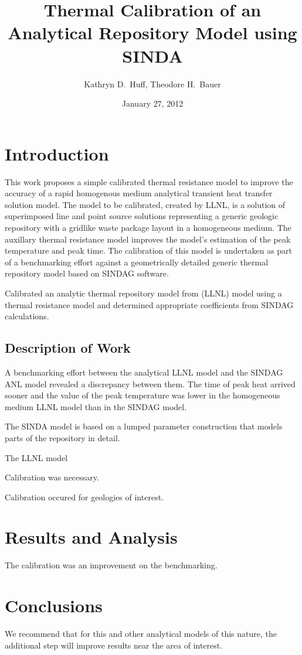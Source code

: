 \documentclass{anstrans}
\title{Thermal Calibration of an Analytical Repository Model using SINDA}
\author{Kathryn D.~Huff, Theodore H.~Bauer}
\institute{Department of Nuclear Engineering \& Engineering Physics, University 
of Wisconsin, Madison, WI, 53706\\
Nuclear Engineering Division, Argonne National Laboratory, Argonne, IL, 60439}
\date{January 27, 2012}
\begin{document}
\section{Introduction}

This work proposes a simple calibrated thermal resistance model to improve the 
accuracy of a rapid homogenous medium analytical transient heat transfer 
solution model. The model to be calibrated, created by \gls{LLNL}, is a solution 
of superimposed line and point source solutions representing a generic geologic 
repository with a gridlike waste package layout in a homogeneous medium. The 
auxillary thermal resistance model improves the model's estimation of the peak 
temperature and peak time. The calibration of this model is undertaken as part 
of a benchmarking effort against a geometrically detailed generic thermal 
repository model based on \gls{SINDAG} software.

Calibrated an analytic thermal repository model from (\gls{LLNL}) model using a 
thermal resistance model and determined appropriate coefficients from 
\gls{SINDAG} calculations. 


\subsection{Description of Work}

A benchmarking effort between the analytical \gls{LLNL} model and the 
\gls{SINDAG} \gls{ANL} model revealed a discrepancy between them. The time of 
peak heat arrived sooner and the value of the peak temperature was lower in the 
homogeneous medium \gls{LLNL} model than in the \gls{SINDAG} model. 

The SINDA model is based on a lumped parameter construction that models parts of 
the repository in detail. 

The LLNL model

Calibration was necessary.

Calibration occured for geologies of interest.  


\section{Results and Analysis}

The calibration was an improvement on the benchmarking.

\section{Conclusions}

We recommend that for this and other analytical models of this nature, the 
additional step will improve results near the area of interest.



\end{document}
